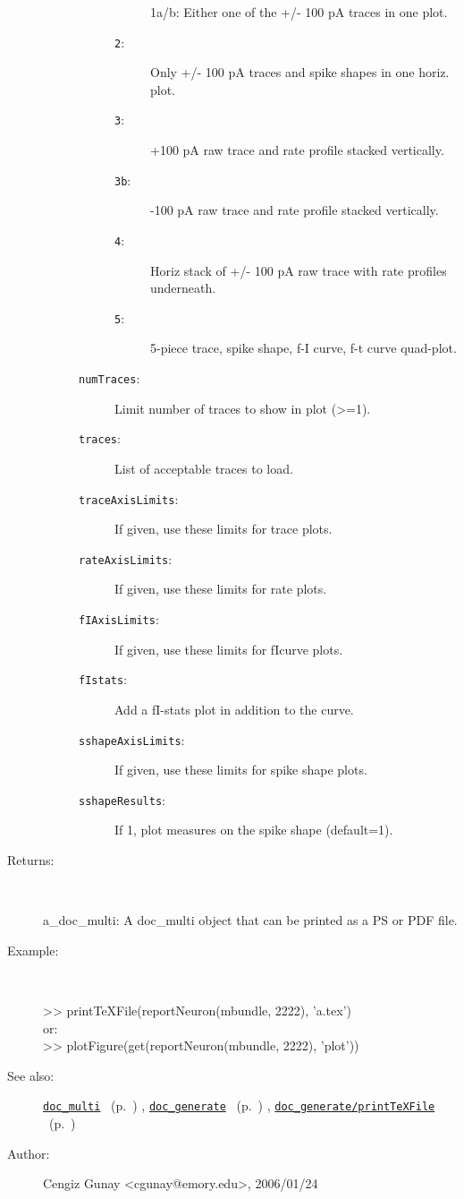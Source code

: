 \begin{description}
\begin{description}
\begin{description}
\begin{description}
1a/b: Either one of the +/- 100 pA traces in one plot.\item[\texttt{2}:]
 Only +/- 100 pA traces and spike shapes in one horiz. plot.
\item[\texttt{3}:]
 +100 pA raw trace and rate profile stacked vertically.
\item[\texttt{3b}:]
 -100 pA raw trace and rate profile stacked vertically.
\item[\texttt{4}:]
 Horiz stack of +/- 100 pA raw trace with rate profiles underneath.
\item[\texttt{5}:]
 5-piece trace, spike shape, f-I curve, f-t curve quad-plot.
\end{description}%
\item[\texttt{numTraces}:]
 Limit number of traces to show in plot (>=1).
\item[\texttt{traces}:]
 List of acceptable traces to load.
\item[\texttt{traceAxisLimits}:]
 If given, use these limits for trace plots.
\item[\texttt{rateAxisLimits}:]
 If given, use these limits for rate plots.
\item[\texttt{fIAxisLimits}:]
 If given, use these limits for fIcurve plots.
\item[\texttt{fIstats}:]
 Add a fI-stats plot in addition to the curve.
\item[\texttt{sshapeAxisLimits}:]
 If given, use these limits for spike shape plots.
\item[\texttt{sshapeResults}:]
 If 1, plot measures on the spike shape (default=1).
\end{description}%
\end{description}%
%
\item[Returns:]~

	a\_doc\_multi: A doc\_multi object that can be printed as a PS or PDF file.
%
\item[Example:]~
\begin{lyxcode} >> printTeXFile(reportNeuron(mbundle, 2222), 'a.tex')\\%
 or:\\%
 >> plotFigure(get(reportNeuron(mbundle, 2222), 'plot'))\\%
\end{lyxcode}
%
\item[See also:]%
\hyperlink{ref_doc_multi}{\texttt{doc\_multi}}%
\ (p.~\pageref{ref_doc_multi})%
%
, \hyperlink{ref_doc_generate}{\texttt{doc\_generate}}%
\ (p.~\pageref{ref_doc_generate})%
%
, \hyperlink{ref_doc_generate__printTeXFile}{\texttt{doc\_generate/printTeXFile}}%
\ (p.~\pageref{ref_doc_generate__printTeXFile})%
%
%
\item[Author:]%
Cengiz Gunay <cgunay@emory.edu>, 2006/01/24%
\end{description}
\methodline%
